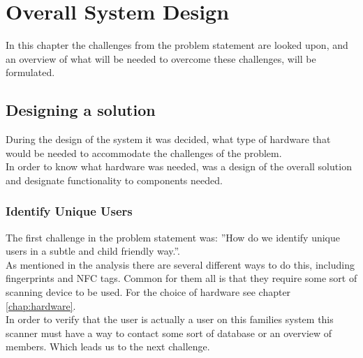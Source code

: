 \chapter{Overall System Design}
In this chapter the challenges from the problem statement are looked upon, and an overview of what will be needed to overcome these challenges, will be formulated.


\section{Designing a solution}
During the design of the system it was decided, what type of hardware that would be needed to accommodate the challenges of the problem.\\
In order to know what hardware was needed, was a design of the overall solution and designate functionality to components needed.\\

\subsection{Identify Unique Users}
The first challenge in the problem statement was: ''How do we identify unique users in a subtle and child friendly way.''.\\
As mentioned in the analysis there are several different ways to do this, including fingerprints and NFC tags. Common for them all is that they require some sort of scanning device to be used. For the choice of hardware see chapter \ref{chap:hardware}.\\
In order to verify that the user is actually a user on this families system this scanner must have a way to contact some sort of database or an overview of members. Which leads us to the next challenge.

